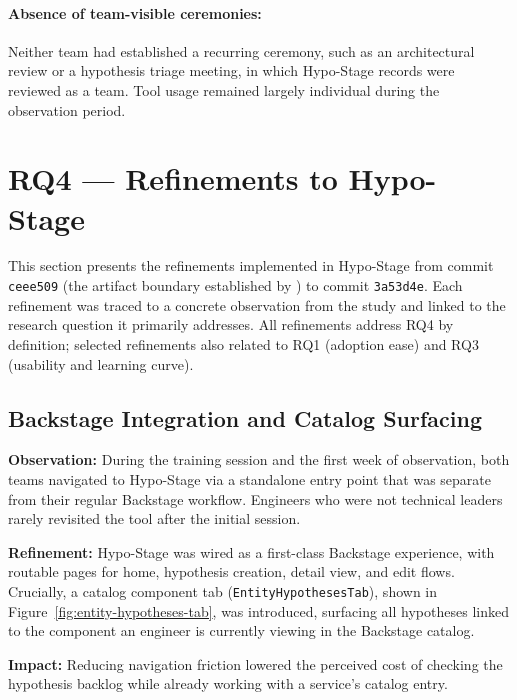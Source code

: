 \paragraph{Absence of team-visible ceremonies:}
Neither team had established a recurring ceremony, such as an architectural
review or a hypothesis triage meeting, in which Hypo-Stage records were reviewed
as a team. Tool usage remained largely individual during the observation period.

\section{RQ4 — Refinements to Hypo-Stage}
\label{sec:rq4-results}
\label{sec:results-rq4}
\label{sec:refinements}

This section presents the refinements implemented in Hypo-Stage from commit
\texttt{ceee509} (the artifact boundary established by \citealt{correa2025}) to
commit \texttt{3a53d4e}. Each refinement was traced
to a concrete observation from the study and linked to the research question it
primarily addresses. All refinements address RQ4 by definition; selected
refinements also related to RQ1 (adoption ease) and RQ3 (usability and learning
curve).

\subsection{Backstage Integration and Catalog Surfacing}
\label{subsec:refinement-backstage}

\textbf{Observation:} During the training session and the first week of
observation, both teams navigated to Hypo-Stage via a standalone entry point
that was separate from their regular Backstage workflow. Engineers who were not
technical leaders rarely revisited the tool after the initial session.

\textbf{Refinement:} Hypo-Stage was wired as a first-class Backstage experience,
with routable pages for home, hypothesis creation, detail view, and edit flows.
Crucially, a catalog component tab (\texttt{EntityHypothesesTab}), shown in Figure~\ref{fig:entity-hypotheses-tab}, was introduced,
surfacing all hypotheses linked to the component an engineer is currently viewing
in the Backstage catalog.

\textbf{Impact:} Reducing navigation friction lowered the perceived cost of
checking the hypothesis backlog while already working with a service's catalog
entry.

